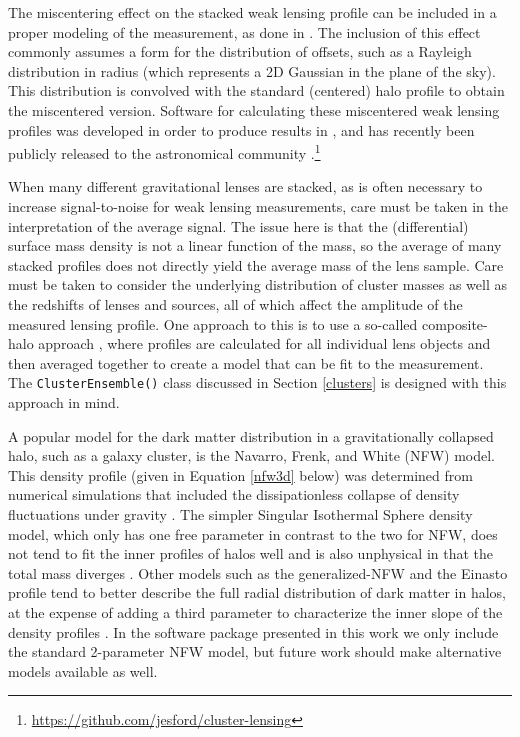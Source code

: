 \documentclass[twocolumn]{aastex6}
\newcommand{\code}{\lstinline[style=codeintext]}
\begin{document}
The miscentering effect on the stacked weak lensing profile can be included in a proper modeling of the measurement, as done in \citet{Johnston07, Mandelbaum10, Oguri11, George12, Sehgal13, Oguri14, Ford14, Ford15, Simet16}. The inclusion of this effect commonly assumes a form for the distribution of offsets, such as a Rayleigh distribution in radius (which represents a 2D Gaussian in the plane of the sky). This distribution is convolved with the standard (centered) halo profile to obtain the miscentered version. Software for calculating these miscentered weak lensing profiles was developed in order to produce results in \citet{Ford14, Ford15}, and has recently been publicly released to the astronomical community \citep{clusterlensing}.\footnote{\url{https://github.com/jesford/cluster-lensing}}

When many different gravitational lenses are stacked, as is often necessary to increase signal-to-noise for weak lensing measurements, care must be taken in the interpretation of the average signal. The issue here is that the (differential) surface mass density is not a linear function of the mass, so the average of many stacked profiles does not directly yield the average mass of the lens sample. Care must be taken to consider the underlying distribution of cluster masses as well as the redshifts of lenses and sources, all of which affect the amplitude of the measured lensing profile. One approach to this is to use a so-called composite-halo approach \citep[e.g.][]{Hildebrandt11, Ford12, Ford14, Ford15, Simet16}, where profiles are calculated for all individual lens objects and then averaged together to create a model that can be fit to the measurement. The \code{ClusterEnsemble()} class discussed in Section \ref{clusters} is designed with this approach in mind.

A popular model for the dark matter distribution in a gravitationally collapsed halo, such as a galaxy cluster, is the Navarro, Frenk, and White (NFW) model. This density profile (given in Equation \ref{nfw3d} below) was determined from numerical simulations that included the dissipationless collapse of density fluctuations under gravity \citep{nfw97}. The simpler Singular Isothermal Sphere density model, which only has one free parameter in contrast to the two for NFW, does not tend to fit the inner profiles of halos well and is also unphysical in that the total mass diverges \citep{Schneider06_WeakGravLens}. Other models such as the generalized-NFW and the Einasto profile tend to better describe the full radial distribution of dark matter in halos, at the expense of adding a third parameter to characterize the inner slope of the density profiles \citep[see e.g. discussion in][]{Dutton14}. In the software package presented in this work we only include the standard 2-parameter NFW model, but future work should make alternative models available as well.
\end{document}
